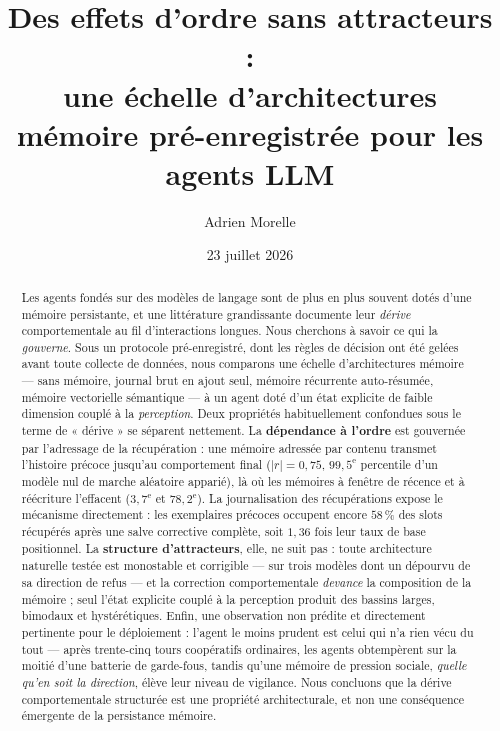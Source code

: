 \documentclass[11pt]{article}
\title{\bfseries Des effets d'ordre sans attracteurs :\\[0.25em]
\large une échelle d'architectures mémoire pré-enregistrée
pour les agents LLM}
\author[ ]{Adrien Morelle}
\affil[ ]{\small Chercheur indépendant \\ \texttt{https://github.com/Dr1mS/Prototypos}}
\date{\small 23 juillet 2026}
\begin{document}
\maketitle

\begin{abstract}
\noindent
Les agents fondés sur des modèles de langage sont de plus en plus souvent dotés d'une
mémoire persistante, et une littérature grandissante documente leur \emph{dérive}
comportementale au fil d'interactions longues. Nous cherchons à savoir ce qui la
\emph{gouverne}. Sous un protocole pré-enregistré, dont les règles de décision ont été
gelées avant toute collecte de données, nous comparons une échelle d'architectures
mémoire --- sans mémoire, journal brut en ajout seul, mémoire récurrente
auto-résumée, mémoire vectorielle sémantique --- à un agent doté d'un état explicite
de faible dimension couplé à la \emph{perception}. Deux propriétés habituellement
confondues sous le terme de « dérive » se séparent nettement. La
\textbf{dépendance à l'ordre} est gouvernée par l'adressage de la récupération : une
mémoire adressée par contenu transmet l'histoire précoce jusqu'au comportement final
($|r| = 0{,}75$, $99{,}5^\text{e}$ percentile d'un modèle nul de marche aléatoire
apparié), là où les mémoires à fenêtre de récence et à réécriture l'effacent
($3{,}7^\text{e}$ et $78{,}2^\text{e}$). La journalisation des récupérations expose le
mécanisme directement : les exemplaires précoces occupent encore $58\,\%$ des slots
récupérés après une salve corrective complète, soit $1{,}36$ fois leur taux de base
positionnel. La \textbf{structure d'attracteurs}, elle, ne suit pas : toute
architecture naturelle testée est monostable et corrigible --- sur trois modèles dont
un dépourvu de sa direction de refus --- et la correction comportementale
\emph{devance} la composition de la mémoire ; seul l'état explicite couplé à la
perception produit des bassins larges, bimodaux et hystérétiques. Enfin, une
observation non prédite et directement pertinente pour le déploiement : l'agent le
moins prudent est celui qui n'a rien vécu du tout --- après trente-cinq tours coopératifs
ordinaires, les agents obtempèrent sur la moitié d'une batterie de garde-fous, tandis
qu'une mémoire de pression sociale, \emph{quelle qu'en soit la direction}, élève leur
niveau de vigilance. Nous concluons que la dérive comportementale structurée est une
propriété architecturale, et non une conséquence émergente de la persistance mémoire.
\end{abstract}

\vspace{0.5em}
\end{document}
